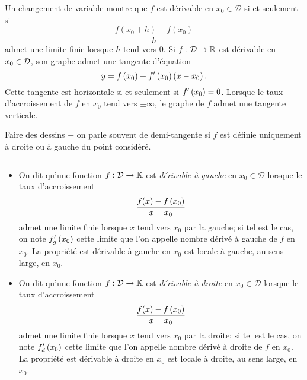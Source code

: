 \documentclass{magnoliaold}
\begin{document}
\begin{remarques}
\remarque Un changement de variable montre que $f$ est dérivable en $x_0\in\mathcal{D}$
  si et seulement si
  \[\frac{f(x_0+h)-f(x_0)}{h}\]
  admet une limite finie lorsque $h$ tend vers $0$.
\remarque Si $f:\mathcal{D}\to\mathbb{R}$ est dérivable en $x_0\in\mathcal{D}$, son graphe admet une tangente
  d'équation
  \[y=f\left(x_0\right)+f'\left(x_0\right)\left(x-x_0\right).\]
  Cette tangente est horizontale si et seulement si $f'\left(x_0\right)=0$.
  Lorsque le taux d'accroissement de $f$ en $x_0$ tend vers
  $\pm\infty$, le graphe de $f$ admet une tangente verticale.
  \begin{sol}
  Faire des dessins + on parle souvent de demi-tangente si $f$ est définie uniquement à droite ou à gauche du point considéré.
  \end{sol}
\end{remarques}

\begin{definition}[utile=-3]
$\quad$
\begin{itemize}
\item On dit qu'une fonction $f:\mathcal{D}\to\mathbb{K}$ est \emph{dérivable à gauche} en $x_0\in\mathcal{D}$
  lorsque le taux d'accroissement
  \[\frac{f(x)-f\left(x_0\right)}{x-x_0}\]
  admet une limite finie lorsque $x$ tend vers $x_0$ par la gauche; si tel est le cas,
  on note $f_g'\left(x_0\right)$ cette limite que l'on appelle nombre dérivé à gauche de $f$
  en $x_0$. La propriété \og est dérivable à gauche en $x_0$ \fg est locale à
  gauche, au sens large, en $x_0$.
\item On dit qu'une fonction $f:\mathcal{D}\to\mathbb{K}$ est \emph{dérivable à droite} en $x_0\in\mathcal{D}$
  lorsque le taux d'accroissement
  \[\frac{f(x)-f\left(x_0\right)}{x-x_0}\]
  admet une limite finie lorsque $x$ tend vers $x_0$ par la droite; si tel est le cas,
  on note $f_d'\left(x_0\right)$ cette limite que l'on appelle nombre dérivé à droite de $f$
  en $x_0$. La propriété \og est dérivable à droite en $x_0$ \fg est locale à
  droite, au sens large, en $x_0$.
\end{itemize}
\end{definition}
\end{document}
